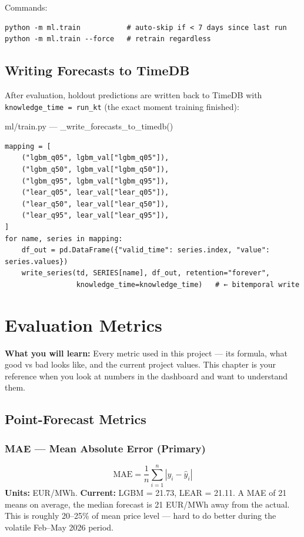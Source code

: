 \documentclass[12pt, a4paper, oneside]{memoir}
\newcommand{\EUR}{EUR/MWh}
\newcommand{\code}[1]{\texttt{\footnotesize #1}}
\begin{document}
Commands:
\begin{verbatim}
python -m ml.train           # auto-skip if < 7 days since last run
python -m ml.train --force   # retrain regardless
\end{verbatim}

\section{Writing Forecasts to TimeDB}

After evaluation, holdout predictions are written back to TimeDB with
\code{knowledge\_time = run\_kt} (the exact moment training finished):

\begin{codefile}{ml/train.py --- \_write\_forecasts\_to\_timedb()}
\begin{verbatim}
mapping = [
    ("lgbm_q05", lgbm_val["lgbm_q05"]),
    ("lgbm_q50", lgbm_val["lgbm_q50"]),
    ("lgbm_q95", lgbm_val["lgbm_q95"]),
    ("lear_q05", lear_val["lear_q05"]),
    ("lear_q50", lear_val["lear_q50"]),
    ("lear_q95", lear_val["lear_q95"]),
]
for name, series in mapping:
    df_out = pd.DataFrame({"valid_time": series.index, "value": series.values})
    write_series(td, SERIES[name], df_out, retention="forever",
                 knowledge_time=knowledge_time)   # ← bitemporal write
\end{verbatim}
\end{codefile}

\chapter{Evaluation Metrics}\label{ch:metrics}

\begin{chapterintro}
\sffamily\small\textbf{What you will learn:} Every metric used in this project ---
its formula, what good vs bad looks like, and the current project values. This chapter
is your reference when you look at numbers in the dashboard and want to understand them.
\end{chapterintro}

\section{Point-Forecast Metrics}

\subsection{MAE --- Mean Absolute Error (Primary)}
\[
  \text{MAE} = \frac{1}{n}\sum_{i=1}^{n}|y_i - \hat{y}_i|
\]
\textbf{Units:} \EUR{}. \textbf{Current:} LGBM = 21.73, LEAR = 21.11.
A MAE of 21 means on average, the median forecast is 21 EUR/MWh away from the actual.
This is roughly 20--25\% of mean price level --- hard to do better during the volatile
Feb--May 2026 period.
\end{document}
